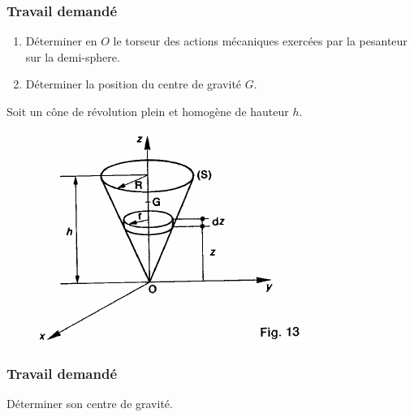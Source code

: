 \subsubsection{Travail demandé}
\begin{enumerate}
\item Déterminer en $O$ le torseur des actions mécaniques exercées par la
pesanteur sur la demi-sphere.
\item Déterminer la position du centre de gravité $G$.
\end{enumerate}

\newpage


Soit un cône de révolution plein et homogène de hauteur $h$.\\

\begin{center}
\includegraphics[scale=0.6]{png/cone.png}
\end{center}

\subsubsection{Travail demandé}
Déterminer son centre de gravité.

\newpage


